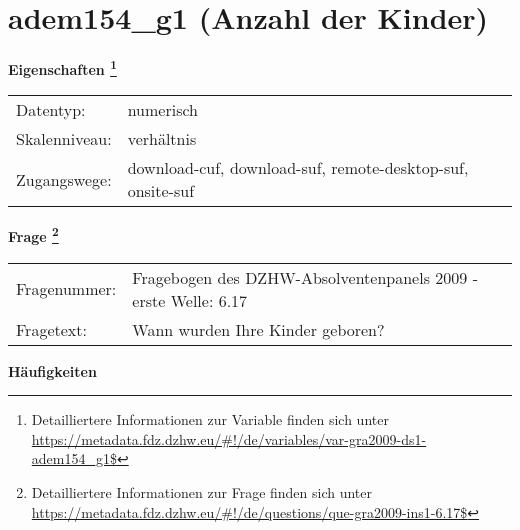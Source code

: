 
    \setcounter{footnote}{0}

    \vspace*{-1.8cm}
	\section{adem154\_g1 (Anzahl der Kinder)}
	\label{section:adem154_g1}



    \vspace*{0.5cm}
    \noindent\textbf{Eigenschaften
	\footnote{Detailliertere Informationen zur Variable finden sich unter
		\url{https://metadata.fdz.dzhw.eu/\#!/de/variables/var-gra2009-ds1-adem154_g1$}}}\\
	\begin{tabularx}{\hsize}{@{}lX}
	Datentyp: & numerisch \\
	Skalenniveau: & verhältnis \\
	Zugangswege: &
	  download-cuf, 
	  download-suf, 
	  remote-desktop-suf, 
	  onsite-suf
 \\
    \end{tabularx}



				\vspace*{0.5cm}
                \noindent\textbf{Frage
	                \footnote{Detailliertere Informationen zur Frage finden sich unter
		              \url{https://metadata.fdz.dzhw.eu/\#!/de/questions/que-gra2009-ins1-6.17$}}}\\
				\begin{tabularx}{\hsize}{@{}lX}
					Fragenummer: &
					  Fragebogen des DZHW-Absolventenpanels 2009 - erste Welle:
					  6.17
 \\
					Fragetext: & Wann wurden Ihre Kinder geboren? \\
				\end{tabularx}





        		\vspace*{0.5cm}
                \noindent\textbf{Häufigkeiten}

